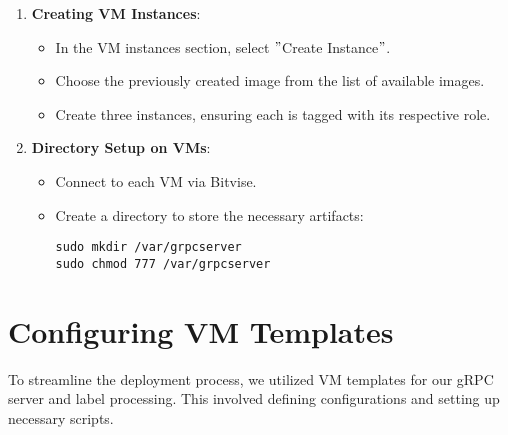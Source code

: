 \begin{enumerate}
    \item \textbf{Creating VM Instances}:
    \begin{itemize}
        \item In the VM instances section, select \("\)Create Instance\("\).
        \item Choose the previously created image from the list of available images.
        \item Create three instances, ensuring each is tagged with its respective role.
    \end{itemize}

    \item \textbf{Directory Setup on VMs}:
    \begin{itemize}
        \item Connect to each VM via Bitvise.
        \item Create a directory to store the necessary artifacts:
        \begin{verbatim}
sudo mkdir /var/grpcserver
sudo chmod 777 /var/grpcserver
        \end{verbatim}
    \end{itemize}
\end{enumerate}


\section{Configuring VM Templates}\label{sec:configuring-vm-templates}

To streamline the deployment process, we utilized VM templates for our gRPC server and label processing. This involved defining configurations and setting up necessary scripts.

